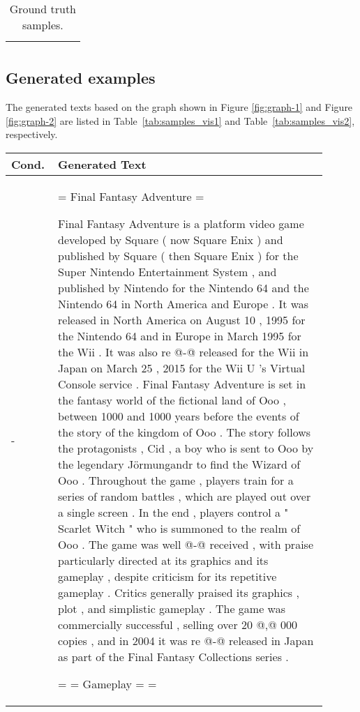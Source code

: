 \documentclass[11pt]{article}
\newcommand{\figref}[1]{Figure \ref{#1}}
\begin{document}
\begin{table*}[h]
\begin{tabular}{p{0.15\linewidth} | p{0.8\linewidth}}
{ 
  } \\

        \cline{1-2}
        \hline
    \end{tabular}
    \caption{Ground truth samples.}
    \label{tab:ground_truth_samples}
\end{table*}


\subsection{Generated examples}
\label{sec:generated_examples}
The generated texts based on the graph shown in \figref{fig:graph-1} and \figref{fig:graph-2} are listed in Table~\ref{tab:samples_vis1} and Table~\ref{tab:samples_vis2}, respectively.

\begin{table*}[h]
    \centering
    \begin{tabular}{p{0.1\linewidth} | p{0.8\linewidth}}
    \hline
        Cond. & Generated Text  \\
        \hline
         - & {\tiny = Final Fantasy Adventure = 
 
 Final Fantasy Adventure is a platform video game developed by Square ( now Square Enix ) and published by Square ( then Square Enix ) for the Super Nintendo Entertainment System , and published by Nintendo for the Nintendo 64 and the Nintendo 64 in North America and Europe . It was released in North America on August 10 , 1995 for the Nintendo 64 and in Europe in March 1995 for the Wii . It was also re @-@ released for the Wii in Japan on March 25 , 2015 for the Wii U 's Virtual Console service . 
 Final Fantasy Adventure is set in the fantasy world of the fictional land of Ooo , between 1000 and 1000 years before the events of the story of the kingdom of Ooo . The story follows the protagonists , Cid , a boy who is sent to Ooo by the legendary Jörmungandr to find the Wizard of Ooo . Throughout the game , players train for a series of random battles , which are played out over a single screen . In the end , players control a " Scarlet Witch " who is summoned to the realm of Ooo . 
 The game was well @-@ received , with praise particularly directed at its graphics and its gameplay , despite criticism for its repetitive gameplay . Critics generally praised its graphics , plot , and simplistic gameplay . The game was commercially successful , selling over 20 @,@ 000 copies , and in 2004 it was re @-@ released in Japan as part of the Final Fantasy Collections series . 
 
 = = Gameplay = = 
 
}
\end{tabular}
\end{table*}
\end{document}
